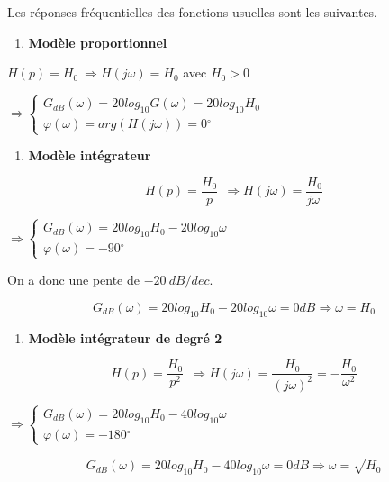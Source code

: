 Les réponses fréquentielles des fonctions usuelles sont les suivantes.

\begin{enumerate}
\def\labelenumi{\arabic{enumi}.}
\item
  \textbf{Modèle proportionnel}
\end{enumerate}

\(H(p) = H_{0}\  \Longrightarrow H(j\omega) = H_{0}\) avec \(H_{0} > 0\)

\(\Rightarrow \left\{ \begin{array}{r}
G_{dB}(\omega) = 20{log_{10}}{G(\omega)} = 20{log_{10}}H_{0} \\
\varphi(\omega) = arg(H(j\omega)) = 0{^\circ}
\end{array} \right.\ \)

\begin{enumerate}
\def\labelenumi{\arabic{enumi}.}
\setcounter{enumi}{1}
\item
  \protect\hypertarget{mod-_Toc337686846}{}{}\textbf{Modèle intégrateur}
\end{enumerate}

\[H(p) = \frac{H_{0}}{p}\ \  \Longrightarrow H(j\omega) = \frac{H_{0}}{j\omega\ }\]

\(\Rightarrow \left\{ \begin{array}{r}
G_{dB}(\omega) = 20{log_{10}}{H_{0} - 20{log_{10}}\omega} \\
\varphi(\omega) = - 90{^\circ}
\end{array} \right.\ \)

On a donc une pente de \(- 20\ dB/dec\).

\[G_{dB}(\omega) = 20{log_{10}}H_{0} - 20{log_{10}}\omega = 0dB \Longrightarrow \omega = H_{0}\]

\begin{enumerate}
\def\labelenumi{\arabic{enumi}.}
\setcounter{enumi}{2}
\item
  \textbf{Modèle intégrateur de degré 2}
\end{enumerate}

\[H(p) = \frac{H_{0}}{p^{2}}\ \  \Longrightarrow H(j\omega) = \frac{H_{0}}{(j\omega)^{2}} = - \frac{H_{0}}{\omega^{2}}\]

\(\Rightarrow \left\{ \begin{array}{r}
G_{dB}(\omega) = 20{log_{10}}{H_{0} - 40{log_{10}}\omega} \\
\varphi(\omega) = - 180{^\circ}
\end{array} \right.\ \)

\[G_{dB}(\omega) = 20{log_{10}}H_{0} - 40{log_{10}}\omega = 0dB \Longrightarrow \omega = \sqrt{H_{0}}\]

